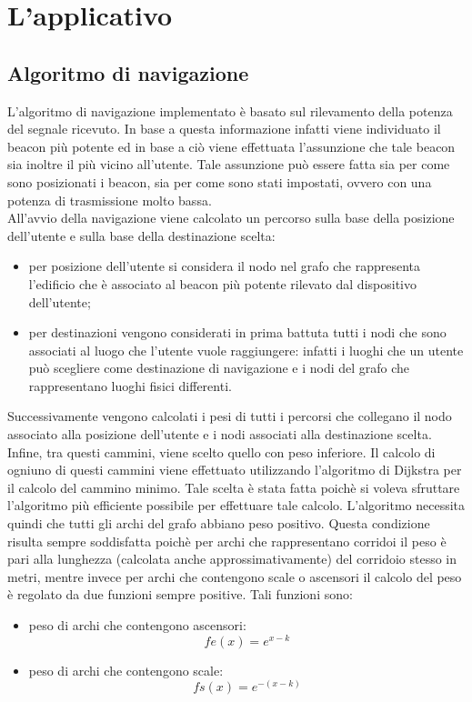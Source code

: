 \documentclass[../SperimentazioniPratiche.tex]{subfiles}
\begin{document}
\section{L'applicativo}
	\subsection{Algoritmo di navigazione}
		L'algoritmo di navigazione implementato è basato sul rilevamento della potenza del segnale ricevuto. In base a questa informazione infatti viene individuato il beacon più potente ed in base a ciò viene effettuata l'assunzione che tale beacon sia inoltre il più vicino all'utente. Tale assunzione può essere fatta sia per come sono posizionati i beacon, sia per come sono stati impostati, ovvero con una potenza di trasmissione molto bassa. \\ All'avvio della navigazione viene calcolato un percorso sulla base della posizione dell'utente e sulla base della destinazione scelta:
		\begin{itemize} 
			\item per posizione dell'utente si considera il nodo nel grafo che rappresenta l'edificio che è associato al beacon più potente rilevato dal dispositivo dell'utente;
			\item per destinazioni vengono considerati in prima battuta tutti i nodi che sono associati al luogo che l'utente vuole raggiungere: infatti i luoghi che un utente può scegliere come destinazione di navigazione e i nodi del grafo che rappresentano luoghi fisici differenti.
		\end{itemize}
		Successivamente vengono calcolati i pesi di tutti i percorsi che collegano il nodo associato alla posizione dell'utente e i nodi associati alla destinazione scelta. Infine, tra questi cammini, viene scelto quello con peso inferiore. Il calcolo di ogniuno di questi cammini viene effettuato utilizzando l'algoritmo di Dijkstra per il calcolo del cammino minimo. Tale scelta è stata fatta poichè si voleva sfruttare l'algoritmo più efficiente possibile per effettuare tale calcolo. L'algoritmo necessita quindi che tutti gli archi del grafo abbiano peso positivo. Questa condizione risulta sempre soddisfatta poichè per archi che rappresentano corridoi il peso è pari alla lunghezza (calcolata anche approssimativamente) del corridoio stesso in metri, mentre invece per archi che contengono scale o ascensori il calcolo del peso è regolato da due funzioni sempre positive. Tali funzioni sono:
		\begin{itemize}
			\item peso di archi che contengono ascensori: \[fe(x) = e^{x-k}\]
			\item peso di archi che contengono scale: \[fs(x) = e^{-(x-k)}\]
		\end{itemize}
\end{document}

